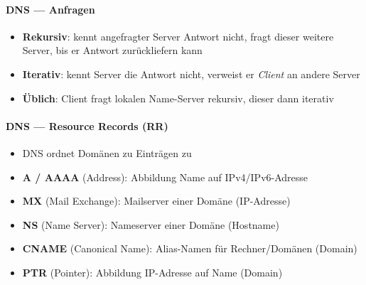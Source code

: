 \paragraph{DNS --- Anfragen}
\begin{itemize}
  \item \textbf{Rekursiv}: kennt angefragter Server Antwort nicht, fragt dieser weitere Server, bis er Antwort zurückliefern kann
  \item \textbf{Iterativ}: kennt Server die Antwort nicht, verweist er \emph{Client} an andere Server
  \item \textbf{Üblich}: Client fragt lokalen Name-Server rekursiv, dieser dann iterativ
\end{itemize}

\paragraph{DNS --- Resource Records (RR)}
\begin{itemize}
  \item DNS ordnet Domänen zu Einträgen zu
  \item \textbf{A / AAAA} (Address): Abbildung Name auf IPv4/IPv6-Adresse
  \item \textbf{MX} (Mail Exchange): Mailserver einer Domäne (IP-Adresse)
  \item \textbf{NS} (Name Server): Nameserver einer Domäne (Hostname)
  \item \textbf{CNAME} (Canonical Name): Alias-Namen für Rechner/Domänen (Domain)
  \item \textbf{PTR} (Pointer): Abbildung IP-Adresse auf Name (Domain)
\end{itemize}

